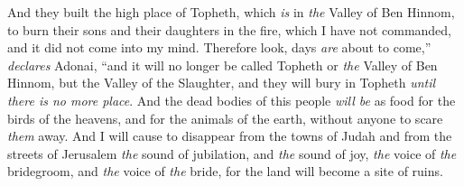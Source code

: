 \begin{biblechapter}
\verse And they built the high place of Topheth, which \textit{is} in \textit{the} Valley of Ben Hinnom, to burn their sons and their daughters in the fire, which I have not commanded, and it did not come into my mind.
\verse Therefore look, days \textit{are} about to come,” \textit{declares} Adonai, “and it will no longer be called Topheth or \textit{the} Valley of Ben Hinnom, but the Valley of the Slaughter, and they will bury in Topheth \textit{until there is no more place}.
\verse And the dead bodies of this people \textit{will be} as food for the birds of the heavens, and for the animals of the earth, without anyone to scare \textit{them} away.
\verse And I will cause to disappear from the towns of Judah and from the streets of Jerusalem \textit{the} sound of jubilation, and \textit{the} sound of joy, \textit{the} voice of \textit{the} bridegroom, and \textit{the} voice of \textit{the} bride, for the land will become a site of ruins.
\end{biblechapter}


